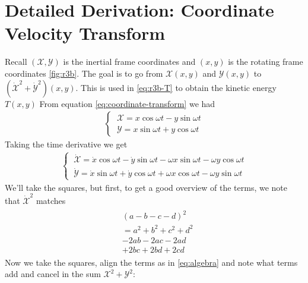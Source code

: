 \chapter{Detailed Derivation: Coordinate Velocity Transform} \label{app:coordinate-transform}
Recall $(\mathscr{X},\mathscr{Y})$ is the inertial frame coordinates and $(x,y)$ is the rotating frame coordinates \ref{fig:r3b}. The goal is to go from $\mathscr{X}(x,y)$ and $\mathscr{Y}(x,y)$ to $(\dot{\mathscr{X}}^2 + \dot{\mathscr{Y}}^2)(x,y)$. This is used in \eqref{eq:r3b-T} to obtain the kinetic energy $T(x,y)$ From equation \eqref{eq:coordinate-transform} we had
\begin{align}
\nonumber
\begin{cases}
\ \mathscr{X} = x\cos{\omega t} - y\sin{\omega t} \\
\ \mathscr{Y} = x\sin{\omega t} + y\cos{\omega t}
\end{cases}
\end{align}
Taking the time derivative we get
\begin{align}
\begin{cases}
\ \dot{\mathscr{X}} = \dot{x}\cos{\omega t} - \dot{y}\sin{\omega t} - \omega x\sin{\omega t} - \omega y\cos{\omega t} \\
\ \dot{\mathscr{Y}} = \dot{x}\sin{\omega t} + \dot{y}\cos{\omega t} + \omega x\cos{\omega t} - \omega y\sin{\omega t}
\end{cases}
\end{align}
We'll take the squares, but first, to get a good overview of the terms, we note that $\dot{\mathscr{X}}^2$ matches
\begin{align}
\begin{split}
\label{eq:algebra}
&(a-b-c-d)^2 \\
&= a^2 + b^2 +c^2 +d^2 \\
&- 2 a b -2 a c - 2 a d \\
&+ 2 b c + 2 b d + 2 c d
\end{split}
\end{align}
Now we take the squares, align the terms as in \eqref{eq:algebra} and note what terms add and cancel in the sum $\mathscr{X}^2 + \mathscr{Y}^2$:
